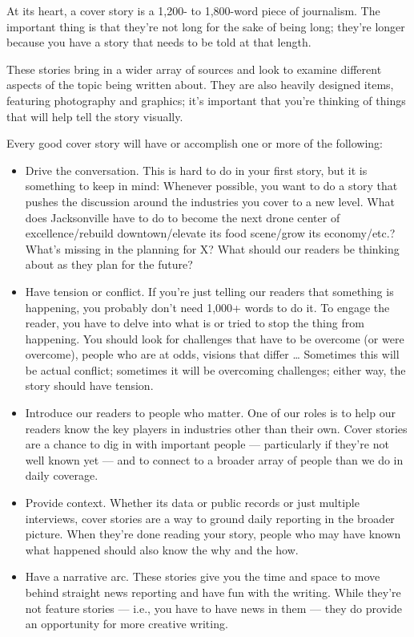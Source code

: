\documentclass[
  11pt,
  american,
  letterpaperpaper,
  extrafontsizes,onecolumn,openright
  ]{memoir}
\providecommand{\tightlist}{%
  \setlength{\itemsep}{0pt}\setlength{\parskip}{0pt}}
\begin{document}
At its heart, a cover story is a 1,200- to 1,800-word piece of journalism. The important thing is that they're not long for the sake of being long; they're longer because you have a story that needs to be told at that length.

These stories bring in a wider array of sources and look to examine different aspects of the topic being written about. They are also heavily designed items, featuring photography and graphics; it's important that you're thinking of things that will help tell the story visually.

Every good cover story will have or accomplish one or more of the following:

\begin{itemize}
\tightlist
\item
  Drive the conversation. This is hard to do in your first story, but it is something to keep in mind: Whenever possible, you want to do a story that pushes the discussion around the industries you cover to a new level. What does Jacksonville have to do to become the next drone center of excellence/rebuild downtown/elevate its food scene/grow its economy/etc.? What's missing in the planning for X? What should our readers be thinking about as they plan for the future?
\item
  Have tension or conflict. If you're just telling our readers that something is happening, you probably don't need 1,000+ words to do it. To engage the reader, you have to delve into what is or tried to stop the thing from happening. You should look for challenges that have to be overcome (or were overcome), people who are at odds, visions that differ \ldots{} Sometimes this will be actual conflict; sometimes it will be overcoming challenges; either way, the story should have tension.
\item
  Introduce our readers to people who matter. One of our roles is to help our readers know the key players in industries other than their own. Cover stories are a chance to dig in with important people --- particularly if they're not well known yet --- and to connect to a broader array of people than we do in daily coverage.
\item
  Provide context. Whether its data or public records or just multiple interviews, cover stories are a way to ground daily reporting in the broader picture. When they're done reading your story, people who may have known what happened should also know the why and the how.
\item
  Have a narrative arc. These stories give you the time and space to move behind straight news reporting and have fun with the writing. While they're not feature stories --- i.e., you have to have news in them --- they do provide an opportunity for more creative writing.
\end{itemize}
\end{document}
